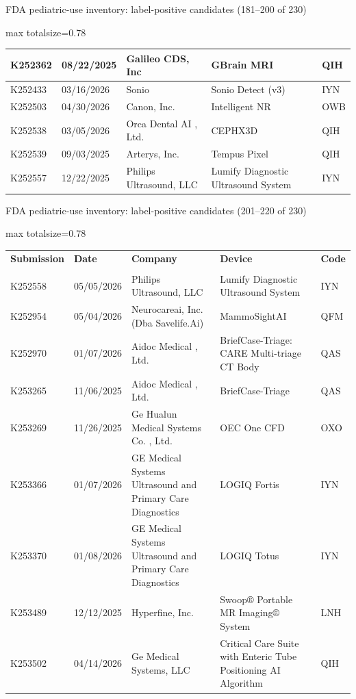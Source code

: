 \documentclass[aspectratio=169]{beamer}
\renewcommand{\arraystretch}{1.08}
\begin{document}
\begin{frame}[category=FDA appendix]{FDA pediatric-use inventory: label-positive candidates (181--200 of 230)}
\begin{adjustbox}{max totalsize={\textwidth}{0.78\textheight}}
\begin{tabular}{|p{}|p{}|p{}|p{}|p{}|}
K252362 & 08/22/2025 & Galileo CDS, Inc & GBrain MRI & QIH \\ \hline
K252433 & 03/16/2026 & Sonio & Sonio Detect  (v3) & IYN \\ \hline
K252503 & 04/30/2026 & Canon, Inc. & Intelligent NR & OWB \\ \hline
K252538 & 03/05/2026 & Orca Dental AI , Ltd. & CEPHX3D & QIH \\ \hline
K252539 & 09/03/2025 & Arterys, Inc. & Tempus Pixel & QIH \\ \hline
K252557 & 12/22/2025 & Philips Ultrasound, LLC & Lumify Diagnostic Ultrasound System & IYN \\ \hline
\end{tabular}
\end{adjustbox}
\end{frame}
\begin{frame}[category=FDA appendix]{FDA pediatric-use inventory: label-positive candidates (201--220 of 230)}
\begin{adjustbox}{max totalsize={\textwidth}{0.78\textheight}}
\renewcommand{\arraystretch}{1.2}
\begin{tabular}{|p{}|p{}|p{}|p{}|p{}|}
\hline \textbf{Submission} & \textbf{Date} & \textbf{Company} & \textbf{Device} & \textbf{Code} \\\\ \hline
K252558 & 05/05/2026 & Philips Ultrasound, LLC & Lumify Diagnostic Ultrasound System & IYN \\ \hline
K252954 & 05/04/2026 & Neurocareai, Inc. (Dba Savelife.Ai) & MammoSightAI & QFM \\ \hline
K252970 & 01/07/2026 & Aidoc Medical , Ltd. & BriefCase-Triage: CARE Multi-triage CT Body & QAS \\ \hline
K253265 & 11/06/2025 & Aidoc Medical , Ltd. & BriefCase-Triage & QAS \\ \hline
K253269 & 11/26/2025 & Ge Hualun Medical Systems Co. , Ltd. & OEC One CFD & OXO \\ \hline
K253366 & 01/07/2026 & GE Medical Systems Ultrasound and Primary Care Diagnostics & LOGIQ Fortis & IYN \\ \hline
K253370 & 01/08/2026 & GE Medical Systems Ultrasound and Primary Care Diagnostics & LOGIQ Totus & IYN \\ \hline
K253489 & 12/12/2025 & Hyperfine, Inc. & Swoop® Portable MR Imaging® System & LNH \\ \hline
K253502 & 04/14/2026 & Ge Medical Systems, LLC & Critical Care Suite with Enteric Tube Positioning AI Algorithm & QIH \\ \hline

\end{tabular}
\end{adjustbox}
\end{frame}
\end{document}
